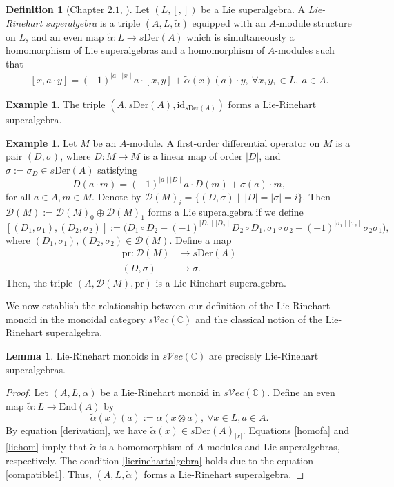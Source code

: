 \documentclass[11pt]{amsart}
\newcommand{\bbC}{\mathbb{C}}
\newcommand{\id}{\mathrm{id}}
\theoremstyle{definition}
\newtheorem{defi}[theo]{Definition}
\newtheorem{lem}[theo]{Lemma}
\newtheorem{exam}[theo]{Example}
\numberwithin{equation}{section}
\begin{document}
\begin{defi}[Chapter $2.1$, \cite{Che95}]
Let $(L, [,])$ be a Lie superalgebra. A \emph{Lie-Rinehart superalgebra} is a triple $(A,L,\tilde{\alpha})$ equipped with an $A$-module structure on $L$, and an even map $\tilde{\alpha}: L \to s\mathrm{Der}(A)$ which is simultaneously a homomorphism of Lie superalgebras and a homomorphism of $A$-modules such that 
\begin{align}\label{lierinehartalgebra}
[x, a \cdot y] =(-1)^{\mid a \mid \mid x \mid}a \cdot [x,y] + \tilde{\alpha}(x)(a) \cdot y, \ \forall x,y,\in L, \ a\in A.   
\end{align}
\end{defi}
\begin{exam}
The triple $(A, s\mathrm{Der}(A),\id_{s\mathrm{Der}(A)} )$ forms a Lie-Rinehart superalgebra. 
\end{exam}
\begin{exam}
Let $M$ be an $A$-module. A first-order differential operator on $M$ is a pair $(D, \sigma)$, where $D:M\to M$ is a linear map of order $| D|$, and $\sigma:=\sigma_D \in s\mathrm{Der}(A)$ satisfying
\[D(a\cdot m)=(-1)^{\mid a \mid \mid D \mid } a \cdot D(m) + \sigma(a) \cdot m,   \]
for all $a\in A,m\in M.$ Denote by $\mathcal{D}(M)_i=\{(D,\sigma) \mid  \ | D | = | \sigma | =i \}$. Then $\mathcal{D}(M):= \mathcal{D}(M)_0 \oplus \mathcal{D}(M)_1$ forms a Lie superalgebra if we define
\[[(D_1,\sigma_1), (D_2,\sigma_2) ]:= \Big(D_1 \circ D_2 - (-1)^{\mid D_1 \mid \mid D_2 \mid } D_2 \circ D_1, \sigma_1 \circ \sigma_2 -(-1)^{\mid \sigma_1 \mid \mid \sigma_2 \mid} \sigma_2 \sigma_1 \Big),     \]
where $(D_1,\sigma_1), (D_2,\sigma_2) \in \mathcal{D}(M).$ Define a map 
\begin{align*}
\mathrm{pr}: \mathcal{D}(M) &\to s\mathrm{Der}(A) \\
(D,\sigma) &\mapsto \sigma.
\end{align*}
Then, the triple $(A, \mathcal{D}(M), \mathrm{pr})$ is a Lie-Rinehart superalgebra. 
\end{exam}

We now establish the relationship between our definition of the Lie-Rinehart monoid in the monoidal category $s\mathcal{V}ec(\bbC)$ and the classical notion of the Lie-Rinehart superalgebra. 
\begin{lem}\label{liemonoid}
Lie-Rinehart monoids in $s\mathcal{V}ec(\bbC)$ are precisely Lie-Rinehart superalgebras.
\end{lem}
\begin{proof}
Let $(A,L,\alpha)$ be a Lie-Rinehart monoid in $s\mathcal{V}ec(\bbC)$. Define an even map $\tilde{\alpha}:L \rightarrow \mathrm{End}(A)$ by 
\[\tilde{\alpha}(x)(a):= \alpha( x\otimes a), \ \forall x\in L,a\in A. \]
By equation \eqref{derivation}, we have $\tilde{\alpha}(x) \in s\mathrm{Der}(A)_{|x|}$.  
Equations \eqref{homofa} and \eqref{liehom} imply that $\tilde{\alpha}$ is a homomorphism of $A$-modules and Lie superalgebras, respectively. The condition \eqref{lierinehartalgebra} holds due to the equation \eqref{compatible1}. Thus, $(A,L,\tilde{\alpha})$ forms a Lie-Rinehart superalgebra. 
\end{proof}
		
\end{document}
